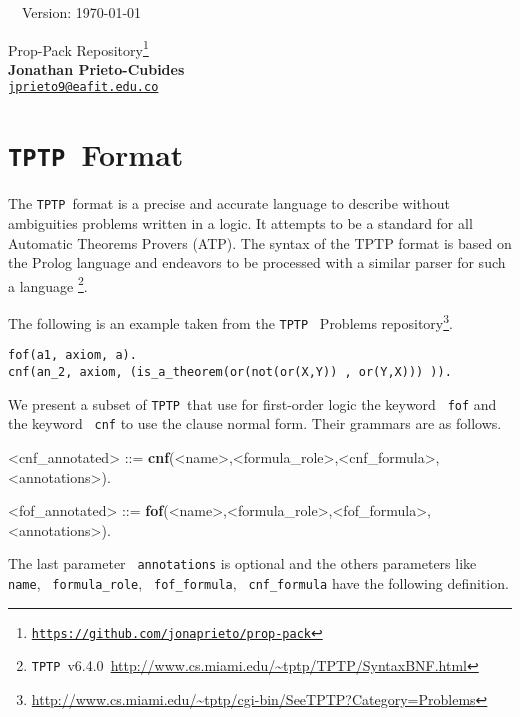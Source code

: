 \documentclass[12pt]{article}
\newcommand{\tptp}[0]{\texorpdfstring{\texttt{TPTP}}\ \ }
\newcommand{\ttext}[1]{\texttt{\color{black} #1}}
\begin{document}

\hrulefill\ \ Version: \today\\

\vspace{3mm}
\begin{center}
{\Large Prop-Pack Repository\footnote{
\href{https://github.com/jonaprieto/prop-pack}{{\color{blue(munsell)}
\texttt{https://github.com/jonaprieto/prop-pack}}}}
}\\
\textbf{Jonathan Prieto-Cubides}\\ %
\href{mailto:jprieto9@eafit.edu.co}{{\color{blue(munsell)}\texttt{jprieto9@eafit.edu.co}}}
\end{center}
\vspace{0.1 cm}

\tableofcontents

\section{\tptp Format}
The \tptp format is a precise and accurate language to describe without
ambiguities problems written in a logic. It attempts to be a standard for
all Automatic Theorems Provers (ATP). The syntax of the TPTP format is based
on the Prolog language and endeavors to be processed with a similar parser for
such a language
\footnote{\tptp v6.4.0~\url{http://www.cs.miami.edu/~tptp/TPTP/SyntaxBNF.html}}.

The following is an example taken from the \tptp
Problems repository\footnote{\url{http://www.cs.miami.edu/~tptp/cgi-bin/SeeTPTP?Category=Problems}}.

\begin{lstlisting}
fof(a1, axiom, a).
cnf(an_2, axiom, (is_a_theorem(or(not(or(X,Y)) , or(Y,X))) )).
\end{lstlisting}

We present a subset of \tptp that use for first-order logic the keyword
\ttext{fof} and the keyword \ttext{cnf} to use the clause normal form.
Their grammars are as follows.

\label{syntax:fof}
\begin{grammar}
<cnf_annotated> ::= \textbf{cnf}(<name>,<formula_role>,<cnf_formula>,<annotations>).

<fof_annotated> ::= \textbf{fof}(<name>,<formula_role>,<fof_formula>,<annotations>).
\end{grammar}

The last parameter \ttext{annotations} is optional and the others parameters like
\ttext{name}, \ttext{formula_role}, \ttext{fof_formula}, \ttext{cnf_formula} have
the following definition.
\end{document}
